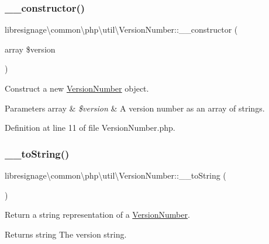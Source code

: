 \subsubsection{\texorpdfstring{\+\_\+\+\_\+constructor()}{\_\_constructor()}}
{\footnotesize\ttfamily libresignage\textbackslash{}common\textbackslash{}php\textbackslash{}util\textbackslash{}\+Version\+Number\+::\+\_\+\+\_\+constructor (\begin{DoxyParamCaption}\item[{array}]{\$version }\end{DoxyParamCaption})}

Construct a new \hyperlink{classlibresignage_1_1common_1_1php_1_1util_1_1VersionNumber}{Version\+Number} object.


\begin{DoxyParams}[1]{Parameters}
array & {\em \$version} & A version number as an array of strings. \\
\hline
\end{DoxyParams}


Definition at line 11 of file Version\+Number.\+php.

\mbox{\label{classlibresignage_1_1common_1_1php_1_1util_1_1VersionNumber_a09e0e81d2568467b284e59c78e25ab1c}} 
\subsubsection{\texorpdfstring{\+\_\+\+\_\+to\+String()}{\_\_toString()}}
{\footnotesize\ttfamily libresignage\textbackslash{}common\textbackslash{}php\textbackslash{}util\textbackslash{}\+Version\+Number\+::\+\_\+\+\_\+to\+String (\begin{DoxyParamCaption}{ }\end{DoxyParamCaption})}

Return a string representation of a \hyperlink{classlibresignage_1_1common_1_1php_1_1util_1_1VersionNumber}{Version\+Number}.

\begin{DoxyReturn}{Returns}
string The version string. 
\end{DoxyReturn}


